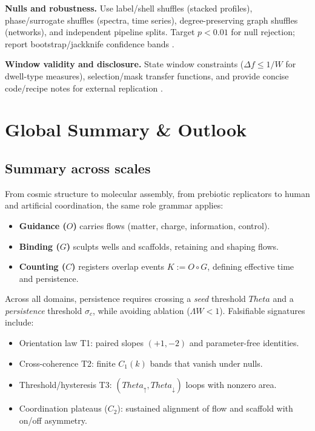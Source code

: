 \documentclass[12pt,a4paper,oneside]{scrreprt}
\def\Theta{Theta}%
\begin{document}
\noindent\textbf{Nulls and robustness.}  
Use label/shell shuffles (stacked profiles), phase/surrogate shuffles (spectra, time series), degree-preserving graph shuffles (networks), and independent pipeline splits.  
Target $p<0.01$ for null rejection; report bootstrap/jackknife confidence bands \cite{Efron1994,Good2005}.

\noindent\textbf{Window validity and disclosure.}  
State window constraints ($\Delta f\le 1/W$ for dwell-type measures), selection/mask transfer functions, and provide concise code/recipe notes for external replication \cite{Munaf2017,Nosek2020}.

\chapter*{Global Summary \& Outlook}

\section*{Summary across scales}
From cosmic structure to molecular assembly, from prebiotic replicators to human and artificial coordination, 
the same role grammar applies:
\begin{itemize}
\item \textbf{Guidance ($O$)} carries flows (matter, charge, information, control).
\item \textbf{Binding ($G$)} sculpts wells and scaffolds, retaining and shaping flows.
\item \textbf{Counting ($C$)} registers overlap events $K:=O\!\circ G$, defining effective time and persistence.
\end{itemize}

Across all domains, persistence requires crossing a \emph{seed} threshold $\Theta$ and a \emph{persistence} threshold $\sigma_c$, 
while avoiding ablation ($\Lambda W<1$).  
Falsifiable signatures include:
\begin{itemize}
\item Orientation law T1: paired slopes $(+1,-2)$ and parameter-free identities.
\item Cross-coherence T2: finite $C_1(k)$ bands that vanish under nulls.
\item Threshold/hysteresis T3: $(\Theta_\uparrow,\Theta_\downarrow)$ loops with nonzero area.
\item Coordination plateaus ($C_2$): sustained alignment of flow and scaffold with on/off asymmetry.
\end{itemize}
\end{document}
